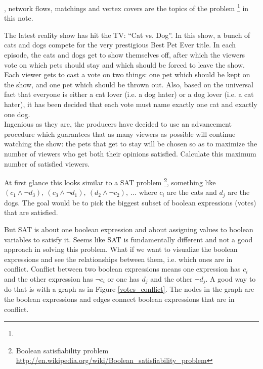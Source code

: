 , network flows, matchings and vertex covers are the topics of the problem \footnote{} in this note.

\begin{fullwidth}

\vspace{10 mm}
\begin{problem}
The latest reality show has hit the TV: “Cat vs. Dog”. In this show, a bunch of cats and dogs compete for the very prestigious Best Pet Ever title. In each episode, the cats and dogs get to show themselves off, after which the viewers vote on which pets should stay and which should be forced to leave the show.
\\

Each viewer gets to cast a vote on two things: one pet which should be kept on the show, and one pet which should be thrown out. Also, based on the universal fact that everyone is either a cat lover (i.e. a dog hater) or a dog lover (i.e. a cat hater), it has been decided that each vote must name exactly one cat and exactly one dog.
\\

Ingenious as they are, the producers have decided to use an advancement procedure which guarantees that as many viewers as possible will continue watching the show: the pets that get to stay will be chosen so as to maximize the number of viewers who get both their opinions satisfied. Calculate this maximum number of satisfied viewers.
\end{problem}

\end{fullwidth}

At first glance this looks similar to a SAT problem \footnote{Boolean satisfiability problem \url{http://en.wikipedia.org/wiki/Boolean_satisfiability_problem}}, something like $(c_1 \land \lnot d_3),\  (c_3 \land \lnot d_1),\  (d_2 \land \lnot c_2),\ \dots$ where $c_i$ are the cats and $d_j$ are the dogs. The goal would be to pick the biggest subset of boolean expressions (votes) that are satisfied.

But SAT is about one boolean expression and about assigning values to boolean variables to satisfy it. Seems like SAT is fundamentally different and not a good approach in solving this problem. What if we want to visualize the boolean expressions and see the relationships between them, i.e. which ones are in conflict. Conflict between two boolean expressions means one expression has $c_i$ and the other expression has $\lnot c_i$ or one has $d_j$ and the other $\lnot d_j$. A good way to do that is with a graph as in Figure \ref{votes_conflict}. The nodes in the graph are the boolean expressions and edges connect  boolean expressions that are in conflict.

